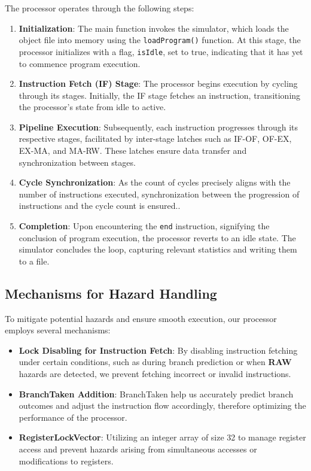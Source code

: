 \documentclass[12pt,a4paper]{article}
\begin{document}
The processor operates through the following steps:

\begin{enumerate}
    \item \textbf{Initialization}: The main function invokes the simulator, which loads the object file into memory using the \texttt{loadProgram()} function. At this stage, the processor initializes with a flag, \texttt{isIdle}, set to true, indicating that it has yet to commence program execution.
    
    \item \textbf{Instruction Fetch (IF) Stage}: The processor begins execution by cycling through its stages. Initially, the IF stage fetches an instruction, transitioning the processor's state from idle to active.
    
    \item \textbf{Pipeline Execution}: Subsequently, each instruction progresses through its respective stages, facilitated by inter-stage latches such as IF-OF, OF-EX, EX-MA, and MA-RW. These latches ensure data transfer and synchronization between stages.
    
    \item \textbf{Cycle Synchronization}: As the count of cycles precisely aligns with the number of instructions executed, synchronization between the progression of instructions and the cycle count is ensured..
    
    \item \textbf{Completion}: Upon encountering the \texttt{end} instruction, signifying the conclusion of program execution, the processor reverts to an idle state. The simulator concludes the loop, capturing relevant statistics and writing them to a file.
\end{enumerate}

\subsection{Mechanisms for Hazard Handling}

To mitigate potential hazards and ensure smooth execution, our processor employs several mechanisms:

\begin{itemize}
    \item \textbf{Lock Disabling for Instruction Fetch}: By disabling instruction fetching under certain conditions, such as during branch prediction or when \textbf{RAW} hazards are detected, we prevent fetching incorrect or invalid instructions.
    
    \item \textbf{BranchTaken Addition}: BranchTaken help us accurately predict branch outcomes and adjust the instruction flow accordingly, therefore optimizing the performance of the processor.
    
    \item \textbf{RegisterLockVector}: Utilizing an integer array of size 32 to manage register access and prevent hazards arising from simultaneous accesses or modifications to registers.
\end{itemize}
\end{document}
